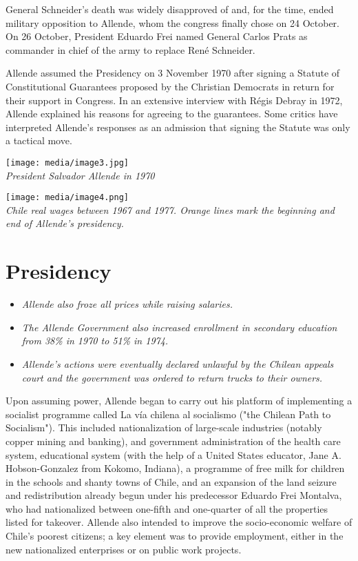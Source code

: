 General Schneider's death was widely disapproved of and, for the time,
ended military opposition to Allende, whom the congress finally chose on
24 October. On 26 October, President Eduardo Frei named General Carlos
Prats as commander in chief of the army to replace René Schneider.

Allende assumed the Presidency on 3 November 1970 after signing a
Statute of Constitutional Guarantees proposed by the Christian Democrats
in return for their support in Congress. In an extensive interview with
Régis Debray in 1972, Allende explained his reasons for agreeing to the
guarantees. Some critics have interpreted Allende's responses as an
admission that signing the Statute was only a tactical move.

\texttt{[image: media/image3.jpg]}\\
\emph{President Salvador Allende in 1970}

\texttt{[image: media/image4.png]}\\
\emph{Chile real wages between 1967 and 1977. Orange lines mark the
beginning and end of Allende's presidency.}

\section{Presidency}\label{presidency}

\begin{itemize}
\item
  \emph{Allende also froze all prices while raising salaries.}
\item
  \emph{The Allende Government also increased enrollment in secondary
  education from 38\% in 1970 to 51\% in 1974.}
\item
  \emph{Allende's actions were eventually declared unlawful by the
  Chilean appeals court and the government was ordered to return trucks
  to their owners.}
\end{itemize}

Upon assuming power, Allende began to carry out his platform of
implementing a socialist programme called La vía chilena al socialismo
("the Chilean Path to Socialism"). This included nationalization of
large-scale industries (notably copper mining and banking), and
government administration of the health care system, educational system
(with the help of a United States educator, Jane A. Hobson-Gonzalez from
Kokomo, Indiana), a programme of free milk for children in the schools
and shanty towns of Chile, and an expansion of the land seizure and
redistribution already begun under his predecessor Eduardo Frei
Montalva, who had nationalized between one-fifth and one-quarter of all
the properties listed for takeover. Allende also intended to improve the
socio-economic welfare of Chile's poorest citizens; a key element was to
provide employment, either in the new nationalized enterprises or on
public work projects.

